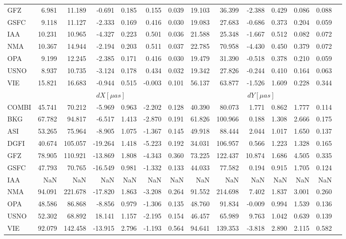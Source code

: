 \documentclass[twocolumn,twoside]{svmultivs_br} %
\begin{document}
\begin{table}[htbp!]
\begin{center}
\begin{tabularx}{\textwidth}{L|RRRRRR|RRRRRRR|}
  GFZ &   6.981 & 11.189 & -0.691 & 0.185 &  0.155 & 0.039 & 19.103 & 36.399 & -2.388 & 0.429 & 0.086 & 0.088 \\
 GSFC &   9.118 & 11.127 & -2.333 & 0.169 &  0.416 & 0.030 & 19.083 & 27.683 & -0.686 & 0.373 & 0.204 & 0.059 \\
 IAA  &  10.231 & 10.965 & -4.327 & 0.223 &  0.501 & 0.036 & 21.588 & 25.348 & -1.667 & 0.512 & 0.082 & 0.072 \\
 NMA  &  10.367 & 14.944 & -2.194 & 0.203 &  0.511 & 0.037 & 22.785 & 70.958 & -4.430 & 0.450 & 0.379 & 0.072 \\
 OPA &   9.199 & 12.245 & -2.385 & 0.171 &  0.416 & 0.030 & 19.479 & 31.390 & -0.518 & 0.378 & 0.210 & 0.059 \\
 USNO &   8.937 & 10.735 & -3.124 & 0.178 &  0.434 & 0.032 & 19.342 & 27.826 & -0.244 & 0.410 & 0.164 & 0.063 \\
  VIE &  15.821 & 16.683 & -0.944 & 0.515 & -0.003 & 0.101 & 56.137 & 63.877 & -1.526 & 1.609 & 0.228 & 0.344 \\
\hline\hline
&  &  \\
\hline
COMBI & 45.741 &  70.212 &  -5.969 & 0.963 & -2.202 & 0.128 & 40.390 &  80.073 &  1.771 & 0.862 & 1.777 & 0.114 \\
  BKG &  67.782 &  94.817 &  -6.517 & 1.413 & -2.870 & 0.191 & 61.826 & 100.966 &  0.188 & 1.308 & 2.666 & 0.175 \\
  ASI &  53.265 &  75.964 &  -8.905 & 1.075 & -1.367 & 0.145 & 49.918 &  88.444 &  2.044 & 1.017 & 1.650 & 0.137 \\
 DGFI &  40.674 & 105.057 & -19.264 & 1.418 & -5.223 & 0.192 & 34.031 & 106.957 &  0.566 & 1.223 & 1.328 & 0.165\\
  GFZ &  78.905 & 110.921 & -13.869 & 1.808 & -4.343 & 0.360 & 73.225 & 122.437 & 10.874 & 1.686 & 4.505 & 0.335 \\
 GSFC & 47.793 &  70.765 & -16.549 & 0.981 & -1.332 & 0.133 & 44.033 &  77.582 &  0.194 & 0.915 & 1.705 & 0.124\\
 IAA  &     NaN &     NaN &     NaN &   NaN &    NaN &   NaN &    NaN &     NaN &    NaN &   NaN &   NaN &   NaN\\
 NMA  &  94.091 & 221.678 & -17.820 & 1.863 & -3.208 & 0.264 & 91.552 & 214.698 &  7.402 & 1.837 & 3.001 & 0.260 \\
 OPA  &  48.586 &  86.868 &  -8.856 & 0.979 & -1.306 & 0.135 & 48.760 &  91.834 & -0.009 & 0.994 & 1.539 & 0.136 \\
 USNO &  52.302 &  68.892 &  18.141 & 1.157 & -2.195 & 0.154 & 46.457 &  65.989 &  9.763 & 1.042 & 0.639 & 0.139  \\
  VIE &  92.079 & 142.458 & -13.915 & 2.796 & -1.193 & 0.564 & 94.641 & 139.353 & -3.818 & 2.890 & 2.115 & 0.582 \\
\hline
\end{tabularx}
\end{center}
\label{tbl:stat}
\end{table}
\end{document}
